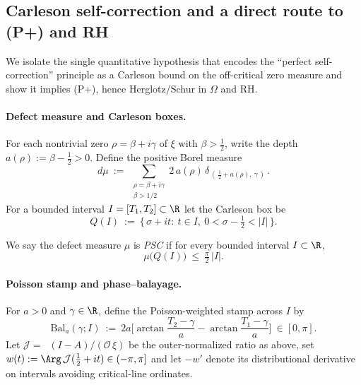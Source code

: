 \documentclass[11pt]{article}
\theoremstyle{remark}
\DeclareMathOperator{\dettwo}{det_2}
\begin{document}
\subsection{Carleson self-correction and a direct route to (P+) and RH}\label{subsec:PSC}
We isolate the single quantitative hypothesis that encodes the ``perfect self-correction'' principle as a Carleson bound on the off-critical zero measure and show it implies (P+), hence Herglotz/Schur in \(\Omega\) and RH.

\paragraph{Defect measure and Carleson boxes.}
For each nontrivial zero \(\rho=\beta+i\gamma\) of \(\xi\) with \(\beta>\tfrac12\), write the depth \(a(\rho):=\beta-\tfrac12>0\). Define the positive Borel measure
\[
 d\mu\ :=\ \sum_{\substack{\rho=\beta+i\gamma\\ \beta>1/2}} 2\,a(\rho)\,\delta_{\,(\,\tfrac12+a(\rho),\ \gamma\,)}\,.
\]
For a bounded interval \(I=[T_1,T_2]\subset\R\) let the Carleson box be
\[
 Q(I)\ :=\ \{\,\sigma+it:\ t\in I,\ 0<\sigma-\tfrac12<|I|\,\}.
\]

\begin{definition}\label{def:PSC}
We say the defect measure \(\mu\) is \emph{PSC} if for every bounded interval \(I\subset\R\),
\[
 \mu\big(Q(I)\big)\ \le\ \tfrac{\pi}{2}\,|I|.
\]
\end{definition}

\paragraph{Poisson stamp and phase--balayage.}
For \(a>0\) and \(\gamma\in\R\), define the Poisson-weighted stamp across \(I\) by
\[
 \mathrm{Bal}_a(\gamma;I)\ :=\ 2a\Big[\arctan\!\frac{T_2-\gamma}{a}-\arctan\!\frac{T_1-\gamma}{a}\Big]\ \in [0,\pi].
\]
Let \(\mathcal J=\dettwo(I-A)/(\mathcal O\,\xi)\) be the outer-normalized ratio as above, set \(w(t):=\Arg\,\mathcal J(\tfrac12+it)\in(-\pi,\pi] \) and let \(-w'\) denote its distributional derivative on intervals avoiding critical-line ordinates.
\end{document}
